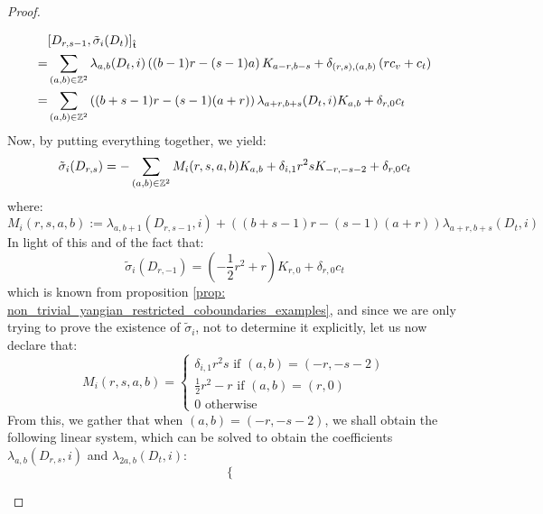 \begin{proof}
\begin{enumerate}
                        $$
                            \begin{aligned}
                                & [D_{r, s - 1}, \tilde{\sigma}_i(D_t)]_{\extendedtoroidal} 
                                \\
                                = & \sum_{(a, b) \in \Z^2} \lambda_{a, b}(D_t, i) \left( (b - 1)r - (s - 1)a \right) K_{a - r, b - s} + \delta_{(r, s), (a, b)} \left( r c_v + c_t \right)
                                \\
                                = & \sum_{(a, b) \in \Z^2} \left( (b + s - 1)r - (s - 1)(a + r) \right) \lambda_{a + r, b + s}(D_t, i) K_{a, b} + \delta_{r, 0} c_t
                            \end{aligned}
                        $$
                    Now, by putting everything together, we yield:
                        $$\tilde{\sigma}_i(D_{r, s}) = -\sum_{(a, b) \in \Z^2} M_i(r, s, a, b) K_{a, b} + \delta_{i, 1} r^2 s K_{-r, -s - 2} + \delta_{r, 0} c_t$$
                    where:
                        $$M_i(r, s, a, b) := \lambda_{a, b + 1}(D_{r, s - 1}, i) + \left( (b + s - 1)r - (s - 1)(a + r) \right) \lambda_{a + r, b + s}(D_t, i)$$
                    In light of this and of the fact that:
                        $$\tilde{\sigma}_i(D_{r, -1}) = (-\frac12 r^2 + r) K_{r, 0} + \delta_{r, 0} c_t$$
                    which is known from proposition \ref{prop: non_trivial_yangian_restricted_coboundaries_examples}, and since we are only trying to prove the existence of $\tilde{\sigma}_i$, not to determine it explicitly, let us now declare that:
                        $$
                            M_i(r, s, a, b) =
                            \begin{cases}
                                \text{$\delta_{i, 1} r^2 s$ if $(a, b) = (-r, -s - 2)$}
                                \\
                                \text{$\frac12 r^2 - r$ if $(a, b) = (r, 0)$}
                                \\
                                \text{$0$ otherwise}
                            \end{cases}
                        $$
                    From this, we gather that when $(a, b) = (-r, -s - 2)$, we shall obtain the following linear system, which can be solved to obtain the coefficients $\lambda_{a, b}(D_{r, s}, i)$ and $\lambda_{2a, b}(D_t, i)$:
                        $$
                            \begin{cases}

\end{cases}$$
\end{enumerate}
\end{proof}
